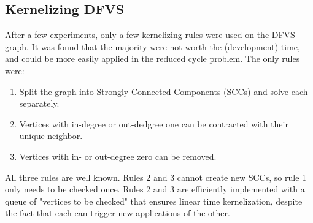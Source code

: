 \documentclass[a4paper,11pt]{article}
\newcommand{\9}{\,\,\,\,\,\,\,\,\,}
\begin{document}
\subsection{Kernelizing DFVS}
After a few experiments, only a few kernelizing rules were used on the DFVS graph. It was found that the majority were not worth the (development) time, and could be more easily applied in the reduced cycle problem. The only rules were:
\begin{enumerate}
\item Split the graph into Strongly Connected Components (SCCs) and solve each separately.
\item Vertices with in-degree or out-dedgree one can be contracted with their unique neighbor.
\item Vertices with in- or out-degree zero can be removed.
\end{enumerate}
All three rules are well known. Rules 2 and 3 cannot create new SCCs, so rule 1 only needs to be checked once. Rules 2 and 3 are efficiently implemented with a queue of "vertices to be checked" that ensures linear time kernelization, despite the fact that each can trigger new applications of the other.
\end{document}
